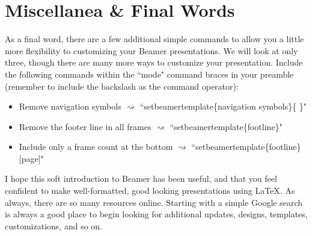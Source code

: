 \documentclass[11pt]{article}
\newcommand{\forceindent}{\leavevmode{\parindent=1.5em\indent}} %
\begin{document}
\newpage

\section{Miscellanea \& Final Words}

\forceindent As a final word, there are a few additional simple commands to allow you a little more flexibility to customizing your Beamer presentations. We will look at only three, though there are many more ways to customize your presentation. Include the following commands within the ``mode" command braces in your preamble (remember to include the backslash as the command operator): \\
\begin{itemize}
	\item Remove navigation symbols $\rightsquigarrow$ ``setbeamertemplate\{navigation symbols\}\{ \}"
	\item Remove the footer line in all frames $\rightsquigarrow$ ``setbeamertemplate\{footline\}"
	\item Include only a frame count at the bottom $\rightsquigarrow$ ``setbeamertemplate\{footline\}[page]" \\
\end{itemize}

I hope this soft introduction to Beamer has been useful, and that you feel confident to make well-formatted, good looking presentations using \LaTeX. As always, there are so many resources online. Starting with a simple Google search is always a good place to begin looking for additional updates, designs, templates, customizations, and so on.
\end{document}

